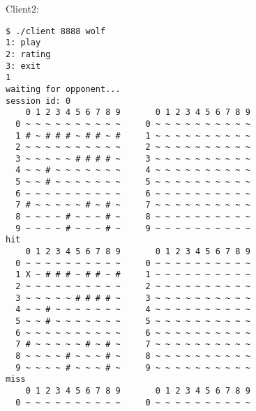\documentclass[12pt]{article}
\begin{document}
Client2:
\begin{lstlisting}
$ ./client 8888 wolf
1: play                                                                         
2: rating                                                                       
3: exit                                                                         
1                                                                            
waiting for opponent...                                                        
session id: 0                                                                   
    0 1 2 3 4 5 6 7 8 9       0 1 2 3 4 5 6 7 8 9                               
  0 ~ ~ ~ ~ ~ ~ ~ ~ ~ ~     0 ~ ~ ~ ~ ~ ~ ~ ~ ~ ~                               
  1 # ~ # # # ~ # # ~ #     1 ~ ~ ~ ~ ~ ~ ~ ~ ~ ~                               
  2 ~ ~ ~ ~ ~ ~ ~ ~ ~ ~     2 ~ ~ ~ ~ ~ ~ ~ ~ ~ ~                               
  3 ~ ~ ~ ~ ~ # # # # ~     3 ~ ~ ~ ~ ~ ~ ~ ~ ~ ~                               
  4 ~ ~ # ~ ~ ~ ~ ~ ~ ~     4 ~ ~ ~ ~ ~ ~ ~ ~ ~ ~                               
  5 ~ ~ # ~ ~ ~ ~ ~ ~ ~     5 ~ ~ ~ ~ ~ ~ ~ ~ ~ ~                               
  6 ~ ~ ~ ~ ~ ~ ~ ~ ~ ~     6 ~ ~ ~ ~ ~ ~ ~ ~ ~ ~                               
  7 # ~ ~ ~ ~ ~ # ~ # ~     7 ~ ~ ~ ~ ~ ~ ~ ~ ~ ~                               
  8 ~ ~ ~ ~ # ~ ~ ~ # ~     8 ~ ~ ~ ~ ~ ~ ~ ~ ~ ~                               
  9 ~ ~ ~ ~ # ~ ~ ~ # ~     9 ~ ~ ~ ~ ~ ~ ~ ~ ~ ~                               
hit                                                                             
    0 1 2 3 4 5 6 7 8 9       0 1 2 3 4 5 6 7 8 9                               
  0 ~ ~ ~ ~ ~ ~ ~ ~ ~ ~     0 ~ ~ ~ ~ ~ ~ ~ ~ ~ ~                            
  1 X ~ # # # ~ # # ~ #     1 ~ ~ ~ ~ ~ ~ ~ ~ ~ ~                               
  2 ~ ~ ~ ~ ~ ~ ~ ~ ~ ~     2 ~ ~ ~ ~ ~ ~ ~ ~ ~ ~                               
  3 ~ ~ ~ ~ ~ # # # # ~     3 ~ ~ ~ ~ ~ ~ ~ ~ ~ ~                               
  4 ~ ~ # ~ ~ ~ ~ ~ ~ ~     4 ~ ~ ~ ~ ~ ~ ~ ~ ~ ~                               
  5 ~ ~ # ~ ~ ~ ~ ~ ~ ~     5 ~ ~ ~ ~ ~ ~ ~ ~ ~ ~                               
  6 ~ ~ ~ ~ ~ ~ ~ ~ ~ ~     6 ~ ~ ~ ~ ~ ~ ~ ~ ~ ~                               
  7 # ~ ~ ~ ~ ~ # ~ # ~     7 ~ ~ ~ ~ ~ ~ ~ ~ ~ ~                               
  8 ~ ~ ~ ~ # ~ ~ ~ # ~     8 ~ ~ ~ ~ ~ ~ ~ ~ ~ ~                               
  9 ~ ~ ~ ~ # ~ ~ ~ # ~     9 ~ ~ ~ ~ ~ ~ ~ ~ ~ ~                              
miss                                                                            
    0 1 2 3 4 5 6 7 8 9       0 1 2 3 4 5 6 7 8 9                            
  0 ~ ~ ~ ~ ~ ~ ~ ~ ~ ~     0 ~ ~ ~ ~ ~ ~ ~ ~ ~ ~                               

\end{lstlisting}
\end{document}
